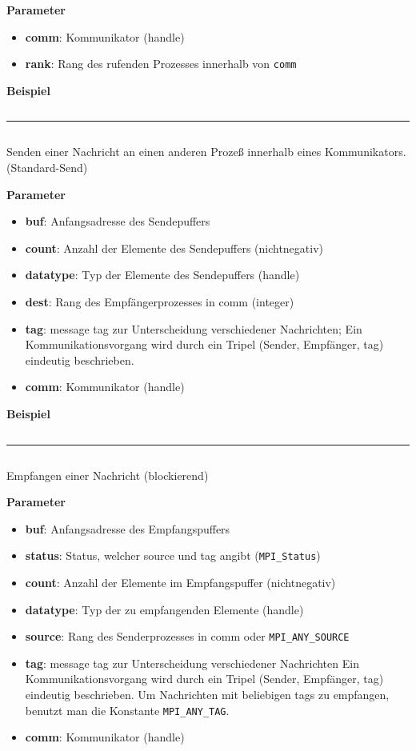 \textbf{Parameter}
\begin{itemize}
    \item \textbf{comm}: Kommunikator (handle)
    \item \textbf{rank}: Rang des rufenden Prozesses innerhalb von \texttt{comm}
\end{itemize}

\textbf{Beispiel}
\inputminted[numbersep=5pt, tabsize=4]{c}{scripts/mpi/comm-rank-example.c}
\rule{\textwidth}{0.4pt}%
\inputminted[numbersep=5pt, tabsize=4]{c}{scripts/mpi/mpi-send.c}
Senden einer Nachricht an einen anderen Prozeß innerhalb eines Kommunikators. (Standard-Send)

\textbf{Parameter}
\begin{itemize}
    \item \textbf{buf}: Anfangsadresse des Sendepuffers 
    \item \textbf{count}: Anzahl der Elemente des Sendepuffers (nichtnegativ) 
    \item \textbf{datatype}: Typ der Elemente des Sendepuffers (handle)
    \item \textbf{dest}: Rang des Empfängerprozesses in comm (integer)
    \item \textbf{tag}: message tag zur Unterscheidung verschiedener Nachrichten; 
Ein Kommunikationsvorgang wird durch ein Tripel (Sender, Empfänger, tag) eindeutig beschrieben. 
    \item \textbf{comm}: Kommunikator (handle)
\end{itemize}

\textbf{Beispiel}
\inputminted[numbersep=5pt, tabsize=4]{c}{scripts/mpi/mpi-send-example.c}
\rule{\textwidth}{0.4pt}%
\inputminted[numbersep=5pt, tabsize=4]{c}{scripts/mpi/mpi-receive.c}
Empfangen einer Nachricht (blockierend) 

\textbf{Parameter}
\begin{itemize}
    \item \textbf{buf}: Anfangsadresse des Empfangspuffers
    \item \textbf{status}: Status, welcher source und tag angibt (\texttt{MPI\_Status}) 
    \item \textbf{count}: Anzahl der Elemente im Empfangspuffer (nichtnegativ)
    \item \textbf{datatype}: Typ der zu empfangenden Elemente (handle)
    \item \textbf{source}: Rang des Senderprozesses in comm oder \texttt{MPI\_ANY\_SOURCE}
    \item \textbf{tag}: message tag zur Unterscheidung verschiedener Nachrichten
                  Ein Kommunikationsvorgang wird durch ein Tripel (Sender, Empfänger, tag) eindeutig beschrieben. Um Nachrichten mit beliebigen tags zu empfangen, benutzt man die Konstante \texttt{MPI\_ANY\_TAG}.
    \item \textbf{comm}: Kommunikator (handle) 
\end{itemize}

